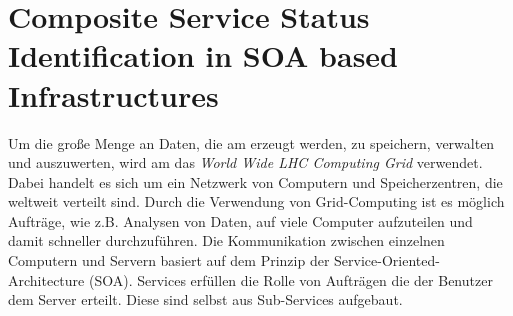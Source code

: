 \section{Composite Service Status Identification in SOA based Infrastructures}
Um die große Menge an Daten, die am \lhc erzeugt werden, zu speichern, verwalten und auszuwerten, wird am \cern das \emph{World Wide LHC Computing Grid} verwendet. Dabei handelt es sich um ein Netzwerk von Computern und Speicherzentren, die weltweit verteilt sind. Durch die Verwendung von Grid-Computing ist es möglich Aufträge, wie z.B. Analysen von Daten, auf viele Computer aufzuteilen und damit schneller durchzuführen. Die Kommunikation zwischen einzelnen Computern und Servern basiert auf dem Prinzip der Service-Oriented-Architecture (SOA). Services erfüllen die Rolle von Aufträgen die der Benutzer dem Server erteilt. Diese sind selbst aus Sub-Services aufgebaut. 